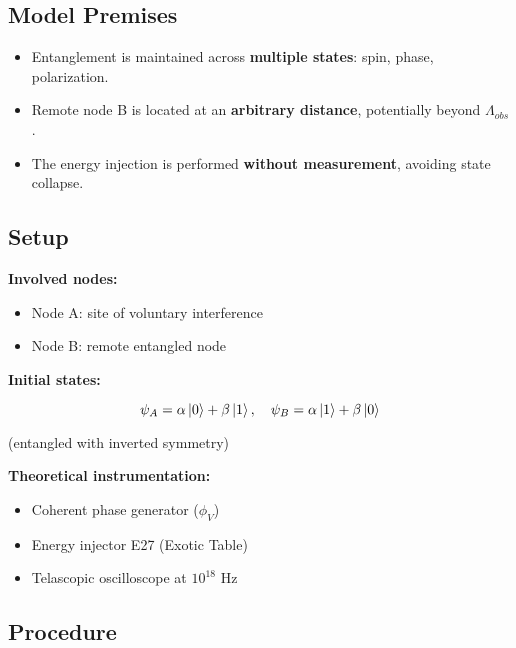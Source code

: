 \documentclass[12pt]{article}
\begin{document}
\subsection*{Model Premises}

\begin{itemize}
    \item Entanglement is maintained across \textbf{multiple states}: spin, phase, polarization.
    \item Remote node B is located at an \textbf{arbitrary distance}, potentially beyond $\Lambda_{obs}$.
    \item The energy injection is performed \textbf{without measurement}, avoiding state collapse.
\end{itemize}

\subsection*{Setup}

\textbf{Involved nodes:}
\begin{itemize}
    \item Node A: site of voluntary interference
    \item Node B: remote entangled node
\end{itemize}

\textbf{Initial states:}

\[
\psi_A = \alpha \ket{0} + \beta \ket{1}, \quad \psi_B = \alpha \ket{1} + \beta \ket{0}
\]

(entangled with inverted symmetry)

\textbf{Theoretical instrumentation:}
\begin{itemize}
    \item Coherent phase generator ($\phi_V$)
    \item Energy injector E27 (Exotic Table)
    \item Telascopic oscilloscope at $10^{18}$ Hz
\end{itemize}

\subsection*{Procedure}
\end{document}
